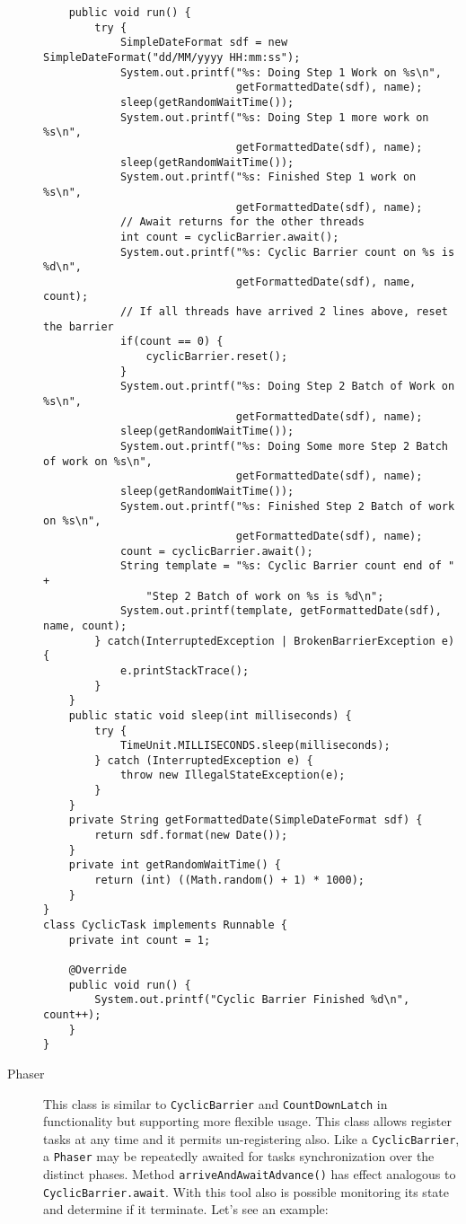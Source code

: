 \documentclass{latex/classes/myarticle}
\begin{document}
\begin{description}
\begin{lstlisting}
    public void run() {
        try {
            SimpleDateFormat sdf = new SimpleDateFormat("dd/MM/yyyy HH:mm:ss");
            System.out.printf("%s: Doing Step 1 Work on %s\n",
                              getFormattedDate(sdf), name);
            sleep(getRandomWaitTime());
            System.out.printf("%s: Doing Step 1 more work on %s\n",
                              getFormattedDate(sdf), name);
            sleep(getRandomWaitTime());
            System.out.printf("%s: Finished Step 1 work on %s\n",
                              getFormattedDate(sdf), name);
            // Await returns for the other threads
            int count = cyclicBarrier.await();
            System.out.printf("%s: Cyclic Barrier count on %s is %d\n",
                              getFormattedDate(sdf), name, count);
            // If all threads have arrived 2 lines above, reset the barrier
            if(count == 0) {
                cyclicBarrier.reset();
            }
            System.out.printf("%s: Doing Step 2 Batch of Work on %s\n",
                              getFormattedDate(sdf), name);
            sleep(getRandomWaitTime());
            System.out.printf("%s: Doing Some more Step 2 Batch of work on %s\n",
                              getFormattedDate(sdf), name);
            sleep(getRandomWaitTime());
            System.out.printf("%s: Finished Step 2 Batch of work on %s\n",
                              getFormattedDate(sdf), name);
            count = cyclicBarrier.await();
            String template = "%s: Cyclic Barrier count end of " +
                "Step 2 Batch of work on %s is %d\n";
            System.out.printf(template, getFormattedDate(sdf), name, count);
        } catch(InterruptedException | BrokenBarrierException e) {
            e.printStackTrace();
        }
    }
    public static void sleep(int milliseconds) {
        try {
            TimeUnit.MILLISECONDS.sleep(milliseconds);
        } catch (InterruptedException e) {
            throw new IllegalStateException(e);
        }
    }
    private String getFormattedDate(SimpleDateFormat sdf) {
        return sdf.format(new Date());
    }
    private int getRandomWaitTime() {
        return (int) ((Math.random() + 1) * 1000);
    }
}
class CyclicTask implements Runnable {
    private int count = 1;

    @Override
    public void run() {
        System.out.printf("Cyclic Barrier Finished %d\n", count++);
    }
}
\end{lstlisting}

\item[{Phaser}] This class is similar to \texttt{CyclicBarrier} and \texttt{CountDownLatch} in
functionality but supporting more flexible usage. This class allows
register tasks at any time and it permits un-registering also. Like a
\texttt{CyclicBarrier}, a \texttt{Phaser} may be repeatedly awaited for tasks synchronization
over the distinct phases. Method \texttt{arriveAndAwaitAdvance()} has effect
analogous to \texttt{CyclicBarrier.await}. With this tool also is possible
monitoring its state and determine if it terminate. Let's see an example:
\end{description}
\end{document}
